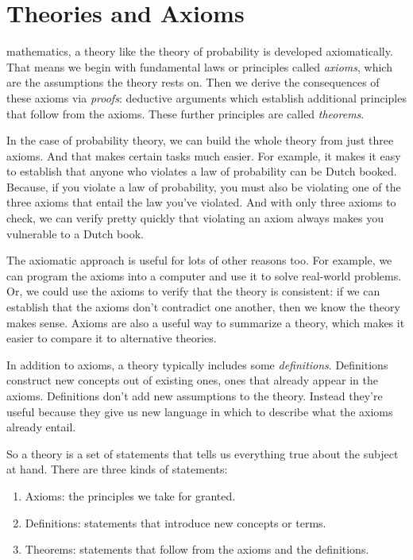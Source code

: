 \documentclass[justified]{tufte-book}
\providecommand{\tightlist}{%
  \setlength{\itemsep}{0pt}\setlength{\parskip}{0pt}}
\theoremstyle{definition}
\theoremstyle{definition}
\theoremstyle{definition}
\theoremstyle{remark}
\begin{document}
\hypertarget{theories-and-axioms}{%
\section*{Theories and Axioms}\label{theories-and-axioms}}

 mathematics, a theory like the theory of probability is
developed axiomatically. That means we begin with fundamental laws or
principles called \emph{axioms}, which are the assumptions the theory
rests on. Then we derive the consequences of these axioms via
\emph{proofs}: deductive arguments which establish additional principles
that follow from the axioms. These further principles are called
\emph{theorems}.

In the case of probability theory, we can build the whole theory from
just three axioms. And that makes certain tasks much easier. For
example, it makes it easy to establish that anyone who violates a law of
probability can be Dutch booked. Because, if you violate a law of
probability, you must also be violating one of the three axioms that
entail the law you've violated. And with only three axioms to check, we
can verify pretty quickly that violating an axiom always makes you
vulnerable to a Dutch book.

The axiomatic approach is useful for lots of other reasons too. For
example, we can program the axioms into a computer and use it to solve
real-world problems. Or, we could use the axioms to verify that the
theory is consistent: if we can establish that the axioms don't
contradict one another, then we know the theory makes sense. Axioms are
also a useful way to summarize a theory, which makes it easier to
compare it to alternative theories.

In addition to axioms, a theory typically includes some
\emph{definitions}. Definitions construct new concepts out of existing
ones, ones that already appear in the axioms. Definitions don't add new
assumptions to the theory. Instead they're useful because they give us
new language in which to describe what the axioms already entail.

So a theory is a set of statements that tells us everything true about
the subject at hand. There are three kinds of statements:

\begin{enumerate}
\def\labelenumi{\arabic{enumi}.}
\tightlist
\item
  Axioms: the principles we take for granted.
\item
  Definitions: statements that introduce new concepts or terms.
\item
  Theorems: statements that follow from the axioms and the definitions.
\end{enumerate}
\end{document}

